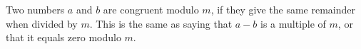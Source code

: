 Two numbers $a$ and $b$ are congruent modulo $m$, if they give the same
remainder when divided by $m$.
This is the same as saying that $a-b$ is a multiple of $m$, or that it equals zero modulo $m$.